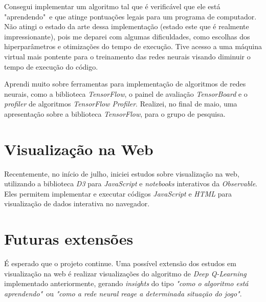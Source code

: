 \documentclass{article}
\begin{document}
        Consegui implementar um algoritmo tal que é verificável que ele está "aprendendo"\ e que
        atinge pontuações legais para um programa de computador. Não atingi o estado da arte dessa
        implementação (estado este que é realmente impressionante),
        pois me deparei com algumas dificuldades,
        como escolhas dos hiperparâmetros e otimizações do tempo de execução.
        Tive acesso a uma máquina virtual mais pontente para
        o treinamento das redes neurais visando diminuir o tempo de execução
        do código.
        
        Aprendi muito sobre ferramentas para implementação
        de algoritmos de redes neurais, como a biblioteca \textit{TensorFlow},
        o painel de avaliação \textit{TensorBoard} e o \textit{profiler} de
        algoritmos \textit{TensorFlow Profiler}. Realizei, no final de maio,
        uma apresentação
        sobre a biblioteca \textit{TensorFlow}, para o grupo de pesquisa.

    \section{Visualização na Web}

        Recentemente, no início de julho, iniciei estudos sobre visualização
        na web, utilizando a biblioteca \textit{D3} para \textit{JavaScript} e 
        \textit{notebooks} interativos da \textit{Observable}. Eles permitem
        implementar e executar códigos \textit{JavaScript} e \textit{HTML}
        para visualização de dados interativa no navegador.

    \section{Futuras extensões}

        É esperado que o projeto continue. Uma possível extensão dos estudos
        em visualização na web é realizar visualizações do algoritmo de \textit{Deep Q-Learning}
        implementado anteriormente, gerando \textit{insights} do tipo \textit{"como o algoritmo está aprendendo"}\
        ou \textit{"como a rede neural reage a determinada situação do jogo"}.

    
    
\end{document}
